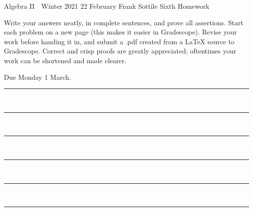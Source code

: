\documentclass[12pt]{article}
\newcommand{\barsl}{\noindent\begin{minipage}[t]{575pt}
{\color{violet}\rule{575pt}{1.2pt}}\vspace{-5.7mm}\\
{\color{blue}\rule{575pt}{1.2pt}}\vspace{-5.7mm}\\
{\color{green}\rule{575pt}{1.2pt}}\vspace{-5.7mm}\\
{\color{yellow}\rule{575pt}{1.2pt}}\vspace{-5.7mm}\\
{\color{orange}\rule{575pt}{1.2pt}}\vspace{-5.7mm}\\
{\color{red}\rule{575pt}{1.2pt}}
\end{minipage}}
\begin{document}
\LARGE 
\noindent
Algebra II\ \ Winter 2021 \hfill 22 February\makebox[40pt][l]{\ }\newline
Frank Sottile \hfill
\Large\sf
Sixth Homework\makebox[40pt][l]{\ }
\vspace{5pt}
\normalsize

\noindent
Write your answers neatly, in complete sentences, and prove all assertions.
Start each problem on a new page (this makes it easier in Gradescope).
Revise your work before handing it in, and submit a .pdf  created from a LaTeX source to Gradescope.
Correct and crisp proofs are greatly appreciated; oftentimes your work can be shortened and made clearer.

\noindent
{\color{red}Due Monday 1 March.}\vspace{1pt}

\barsl
\end{document}
